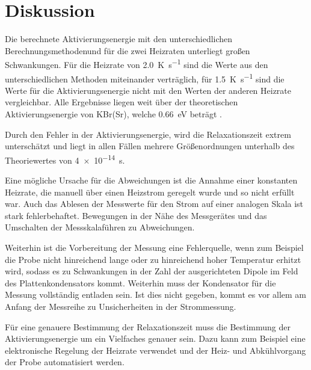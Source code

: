 \section{Diskussion}

Die berechnete Aktivierungsenergie mit den unterschiedlichen Berechnungsmethodenund für die zwei Heizraten unterliegt großen Schwankungen. Für die Heizrate von \SI{2.0}{\kelvin\per\second} sind die Werte aus den unterschiedlichen Methoden miteinander verträglich, für \SI{1.5}{\kelvin\per\second} sind die Werte für die Aktivierungsenergie nicht mit den Werten der anderen Heizrate vergleichbar. Alle Ergebnisse liegen weit über der theoretischen Aktivierungsenergie von KBr(Sr), welche \SI{0.66}{\electronvolt} beträgt \cite{KBr-Sr}.\par
Durch den Fehler in der Aktivierungsenergie, wird die Relaxationszeit extrem unterschätzt und liegt in allen Fällen mehrere Größenordnungen unterhalb des Theoriewertes von \SI{4e-14}{\second}.\par
Eine mögliche Ursache für die Abweichungen ist die Annahme einer konstanten Heizrate, die manuell über einen Heizstrom geregelt wurde und so nicht erfüllt war. Auch das Ablesen der Messwerte für den Strom auf einer analogen Skala ist stark fehlerbehaftet. Bewegungen in der Nähe des Messgerätes und das Umschalten der Messskalaführen zu Abweichungen.\par
Weiterhin ist die Vorbereitung der Messung eine Fehlerquelle, wenn zum Beispiel die Probe nicht hinreichend lange oder zu hinreichend hoher Temperatur erhitzt wird, sodass es zu Schwankungen in der Zahl der ausgerichteten Dipole im Feld des Plattenkondensators kommt. Weiterhin muss der Kondensator für die Messung vollständig entladen sein. Ist dies nicht gegeben, kommt es vor allem am Anfang der Messreihe zu Unsicherheiten in der Strommessung.\par
Für eine genauere Bestimmung der Relaxationszeit muss die Bestimmung der Aktivierungsenergie um ein Vielfaches genauer sein. Dazu kann zum Beispiel eine elektronische Regelung der Heizrate verwendet und der Heiz- und Abkühlvorgang der Probe automatisiert werden.

\printbibliography
